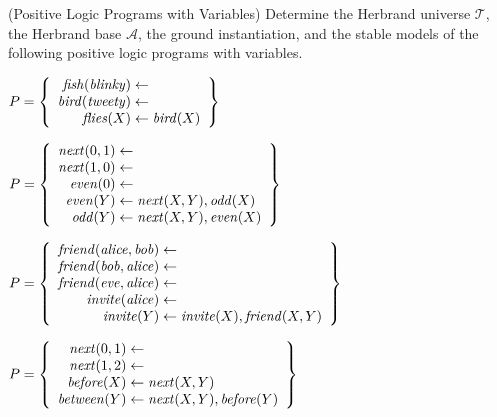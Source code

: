 \begin{Uebung}{(Positive Logic Programs with Variables)}%
Determine the Herbrand universe $\mathcal{T}$,
the Herbrand base $\mathcal{A}$,
the ground instantiation,
and the stable models of the following
positive logic programs with variables.

\begin{UList}
\item
\(
P =
\left\{
\begin{array}{r@{{}\leftarrow{}}l}
    \mathit{fish}(\mathit{blinky})        \\
    \mathit{bird}(\mathit{tweety})      \\
    \mathit{flies}(X) & \mathit{bird}(X) %
\end{array}
\right\}
\)
\item 
\(
P =
\left\{
\begin{array}{r@{{}\leftarrow{}}l}
    \mathit{next}(0,1) \\
    \mathit{next}(1,0) \\
    \mathit{even}(0)  \\
    \mathit{even}(Y) & \mathit{next}(X,Y), \mathit{odd}(X)  \\
    \mathit{odd}(Y)  & \mathit{next}(X,Y), \mathit{even}(X)
\end{array}
\right\}
\)
\item
\(
P =
\left\{
\begin{array}{r@{{}\leftarrow{}}l}
    \mathit{friend}(\mathit{alice},\mathit{bob})  \\
    \mathit{friend}(\mathit{bob},\mathit{alice})  \\
    \mathit{friend}(\mathit{eve},\mathit{alice})  \\
    \mathit{invite}(\mathit{alice})  \\
    \mathit{invite}(Y) & \mathit{invite}(X), \mathit{friend}(X,Y)
\end{array}
\right\}
\)
\item
\(
P =
\left\{
\begin{array}{r@{{}\leftarrow{}}l}
    \mathit{next}(0,1) \\
    \mathit{next}(1,2) \\
    \mathit{before}(X)   & \mathit{next}(X,Y) \\
    \mathit{between}(Y)  & \mathit{next}(X,Y), \mathit{before}(Y)
\end{array}
\right\}
\)
\end{UList}
\end{Uebung}

